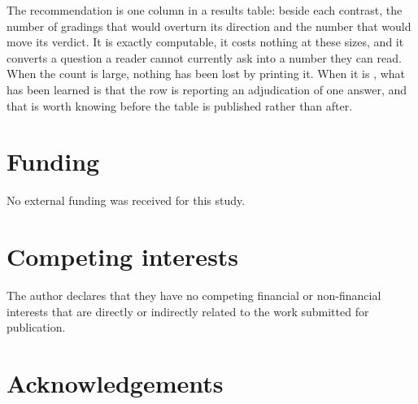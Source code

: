 The recommendation is one column in a results table: beside each contrast, the
number of gradings that would overturn its direction and the number that would
move its verdict. It is exactly computable, it costs nothing at these sizes, and
it converts a question a reader cannot currently ask into a number they can
read. When the count is large, nothing has been lost by printing it. When it is
\HarmK{}, what has been learned is that the row is reporting an adjudication of
one answer, and that is worth knowing before the table is published rather than
after.

\section*{Funding}

No external funding was received for this study.

\section*{Competing interests}

The author declares that they have no competing financial or non-financial
interests that are directly or indirectly related to the work submitted for
publication.

\ifdefined\DRAFTTODO
\section*{Acknowledgements}

\fi

